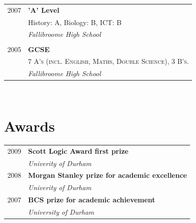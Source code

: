 \documentclass[10pt]{article} %
\begin{document}
{\begin{minipage}[t]{0.44\textwidth}
\begin{tabular}{rl}

2007 & \textbf{'A' Level}\\
& \small History: A, Biology: B, ICT: B \\
& \textit{Fallibroome High School}\\
&\\
	 

2005 & \textbf{GCSE}\\
& \textsc{7 A’s (incl. English, Maths, Double Science), 3 B’s.} \\
& \textit{Fallibroome High School} 
	

\end{tabular}\\[10pt]


\section{Awards} 

\begin{tabular}{rl}

2009	 & \textbf{Scott Logic Award first prize}\\
& \textit{Univerity of Durham}\\

2008	 & \textbf{Morgan Stanley prize for academic excellence}\\
& \textit{Univerity of Durham}\\

2007	 & \textbf{BCS prize for academic achievement}\\
& \textit{University of Durham}\\

\end{tabular}\\[10pt]




\end{minipage}}
\end{document}
